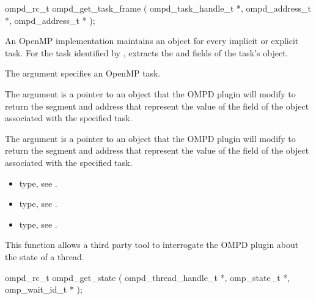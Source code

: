 \format
\cspecificstart
\begin{boxedcode}
ompd\_rc\_t ompd\_get\_task\_frame (
  ompd\_task\_handle\_t  *, 
  ompd\_address\_t  *,
  ompd\_address\_t *
);
\end{boxedcode}
\cspecificend



\descr
An OpenMP implementation  maintains an  object for every implicit or explicit task. 
For the task identified by ,  extracts 
the  and  fields of the task's  object.

\argdesc

The argument  specifies an OpenMP task.

The argument  is a pointer to an  object that the OMPD plugin will 
modify to return the segment and address that represent the value of the  
field of the  object associated with the specified task.

The argument  is a pointer to an  object that the OMPD plugin will 
modify to return the segment and address that represent the value of the  
field of the  object associated with the specified task.

\crossreferences
\begin{itemize}
	\item {} type, see .
	\item {} type, see .
	\item {} type, see .
\end{itemize}


\label{ompd:ompd_get_state}
\summary
This function allows a third party tool to interrogate the OMPD plugin about the state of a thread.

\format
\cspecificstart
\begin{boxedcode}
ompd\_rc\_t ompd\_get\_state (
  ompd\_thread\_handle\_t *,
  omp\_state\_t *,
  omp\_wait\_id\_t    *
);
\end{boxedcode}
\cspecificend


